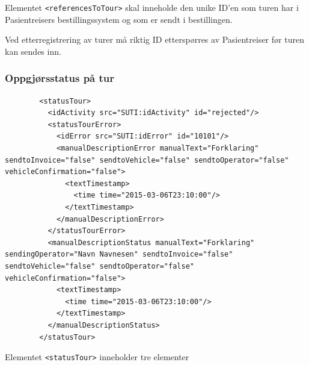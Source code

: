 \documentclass[a4paper,titlepage,norsk,11pt]{article}
\begin{document}
Elementet \lstinline{<referencesToTour>} skal inneholde den unike ID'en som turen har i Pasientreisers bestillingssystem og som er sendt i bestillingen.

Ved etterregistrering av turer må riktig ID etterspørres av Pasientreiser før turen kan sendes inn.

\subsubsection{Oppgjørsstatus på tur}

\begin{lstlisting}
        <statusTour>
          <idActivity src="SUTI:idActivity" id="rejected"/>
          <statusTourError>
            <idError src="SUTI:idError" id="10101"/>
            <manualDescriptionError manualText="Forklaring" sendtoInvoice="false" sendtoVehicle="false" sendtoOperator="false" vehicleConfirmation="false">
              <textTimestamp>
                <time time="2015-03-06T23:10:00"/>
              </textTimestamp>
            </manualDescriptionError>
          </statusTourError>
          <manualDescriptionStatus manualText="Forklaring" sendingOperator="Navn Navnesen" sendtoInvoice="false" sendtoVehicle="false" sendtoOperator="false" vehicleConfirmation="false">
            <textTimestamp>
              <time time="2015-03-06T23:10:00"/>
            </textTimestamp>
          </manualDescriptionStatus>
        </statusTour>
\end{lstlisting}

Elementet \lstinline{<statusTour>} inneholder tre elementer
\end{document}
